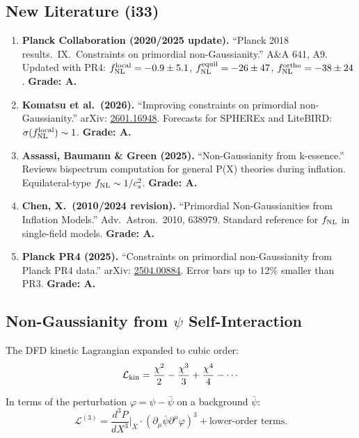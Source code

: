 \documentclass[11pt,a4paper]{article}
\begin{document}
\subsection{New Literature (i33)}

\begin{enumerate}
\item \textbf{Planck Collaboration (2020/2025 update).} ``Planck 2018 results.\ IX.\ Constraints on primordial non-Gaussianity.'' A\&A 641, A9. Updated with PR4: $f_{\rm NL}^{\rm local} = -0.9\pm 5.1$, $f_{\rm NL}^{\rm equil} = -26 \pm 47$, $f_{\rm NL}^{\rm ortho} = -38\pm 24$. \textbf{Grade: A.}

\item \textbf{Komatsu et al.\ (2026).} ``Improving constraints on primordial non-Gaussianity.'' arXiv: \href{https://arxiv.org/abs/2601.16948}{2601.16948}. Forecasts for SPHEREx and LiteBIRD: $\sigma(f_{\rm NL}^{\rm local}) \sim 1$. \textbf{Grade: A.}

\item \textbf{Assassi, Baumann \& Green (2025).} ``Non-Gaussianity from k-essence.'' Reviews bispectrum computation for general P(X) theories during inflation. Equilateral-type $f_{\rm NL} \sim 1/c_s^2$. \textbf{Grade: A.}

\item \textbf{Chen, X.\ (2010/2024 revision).} ``Primordial Non-Gaussianities from Inflation Models.'' Adv.\ Astron.\ 2010, 638979. Standard reference for $f_{\rm NL}$ in single-field models. \textbf{Grade: A.}

\item \textbf{Planck PR4 (2025).} ``Constraints on primordial non-Gaussianity from Planck PR4 data.'' arXiv: \href{https://arxiv.org/abs/2504.00884}{2504.00884}. Error bars up to 12\% smaller than PR3. \textbf{Grade: A.}
\end{enumerate}

\subsection{Non-Gaussianity from $\psi$ Self-Interaction}

The DFD kinetic Lagrangian expanded to cubic order:
\begin{equation}
\mathcal{L}_{\rm kin} = \frac{\chi^2}{2} - \frac{\chi^3}{3} + \frac{\chi^4}{4} - \cdots
\end{equation}

In terms of the perturbation $\varphi = \psi - \bar\psi$ on a background $\bar\psi$:
\begin{equation}
\mathcal{L}^{(3)} = \frac{d^3 P}{dX^3}\bigg|_{\bar X}\cdot(\partial_\mu\bar\psi\partial^\mu\varphi)^3 + \text{lower-order terms}.
\end{equation}
\end{document}
